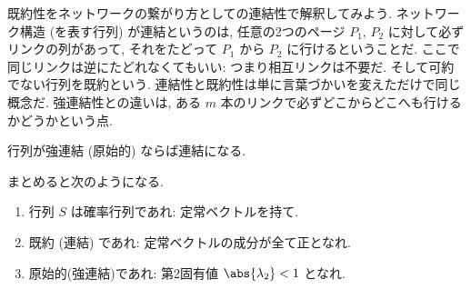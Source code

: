 \documentclass[openany, a4paper, oneside]{jsbook}
\begin{document}
既約性をネットワークの繋がり方としての連結性で解釈してみよう.
ネットワーク構造 (を表す行列) が連結というのは,
任意の2つのページ $P_1, \, P_2$ に対して必ずリンクの列があって,
それをたどって $P_1$ から $P_2$ に行けるということだ.
ここで同じリンクは逆にたどれなくてもいい: つまり相互リンクは不要だ.
そして可約でない行列を既約という.
連結性と既約性は単に言葉づかいを変えただけで同じ概念だ.
強連結性との違いは, ある $m$ 本のリンクで必ずどこからどこへも行けるかどうかという点.
\begin{rem}
行列が強連結 (原始的) ならば連結になる.
\end{rem}

まとめると次のようになる.
\begin{enumerate}
\item 行列 $S$ は確率行列であれ: 定常ベクトルを持て.
\item 既約 (連結) であれ: 定常ベクトルの成分が全て正となれ.
\item 原始的(強連結)であれ: 第2固有値 $\abs{\lambda_2} < 1$ となれ.
\end{enumerate}
\end{document}
